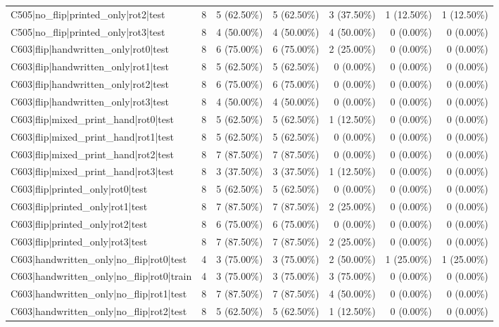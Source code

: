 \begin{longtable}{>{\raggedright\arraybackslash}p{5cm}rrrrrr}
C505|no\_flip|printed\_only|rot2|test & 8 & 5 (62.50\%) & 5 (62.50\%) & 3 (37.50\%) & 1 (12.50\%) & 1 (12.50\%) \\
C505|no\_flip|printed\_only|rot3|test & 8 & 4 (50.00\%) & 4 (50.00\%) & 4 (50.00\%) & 0 (0.00\%) & 0 (0.00\%) \\
C603|flip|handwritten\_only|rot0|test & 8 & 6 (75.00\%) & 6 (75.00\%) & 2 (25.00\%) & 0 (0.00\%) & 0 (0.00\%) \\
C603|flip|handwritten\_only|rot1|test & 8 & 5 (62.50\%) & 5 (62.50\%) & 0 (0.00\%) & 0 (0.00\%) & 0 (0.00\%) \\
C603|flip|handwritten\_only|rot2|test & 8 & 6 (75.00\%) & 6 (75.00\%) & 0 (0.00\%) & 0 (0.00\%) & 0 (0.00\%) \\
C603|flip|handwritten\_only|rot3|test & 8 & 4 (50.00\%) & 4 (50.00\%) & 0 (0.00\%) & 0 (0.00\%) & 0 (0.00\%) \\
C603|flip|mixed\_print\_hand|rot0|test & 8 & 5 (62.50\%) & 5 (62.50\%) & 1 (12.50\%) & 0 (0.00\%) & 0 (0.00\%) \\
C603|flip|mixed\_print\_hand|rot1|test & 8 & 5 (62.50\%) & 5 (62.50\%) & 0 (0.00\%) & 0 (0.00\%) & 0 (0.00\%) \\
C603|flip|mixed\_print\_hand|rot2|test & 8 & 7 (87.50\%) & 7 (87.50\%) & 0 (0.00\%) & 0 (0.00\%) & 0 (0.00\%) \\
C603|flip|mixed\_print\_hand|rot3|test & 8 & 3 (37.50\%) & 3 (37.50\%) & 1 (12.50\%) & 0 (0.00\%) & 0 (0.00\%) \\
C603|flip|printed\_only|rot0|test & 8 & 5 (62.50\%) & 5 (62.50\%) & 0 (0.00\%) & 0 (0.00\%) & 0 (0.00\%) \\
C603|flip|printed\_only|rot1|test & 8 & 7 (87.50\%) & 7 (87.50\%) & 2 (25.00\%) & 0 (0.00\%) & 0 (0.00\%) \\
C603|flip|printed\_only|rot2|test & 8 & 6 (75.00\%) & 6 (75.00\%) & 0 (0.00\%) & 0 (0.00\%) & 0 (0.00\%) \\
C603|flip|printed\_only|rot3|test & 8 & 7 (87.50\%) & 7 (87.50\%) & 2 (25.00\%) & 0 (0.00\%) & 0 (0.00\%) \\
C603|handwritten\_only|no\_flip|rot0|test & 4 & 3 (75.00\%) & 3 (75.00\%) & 2 (50.00\%) & 1 (25.00\%) & 1 (25.00\%) \\
C603|handwritten\_only|no\_flip|rot0|train & 4 & 3 (75.00\%) & 3 (75.00\%) & 3 (75.00\%) & 0 (0.00\%) & 0 (0.00\%) \\
C603|handwritten\_only|no\_flip|rot1|test & 8 & 7 (87.50\%) & 7 (87.50\%) & 4 (50.00\%) & 0 (0.00\%) & 0 (0.00\%) \\
C603|handwritten\_only|no\_flip|rot2|test & 8 & 5 (62.50\%) & 5 (62.50\%) & 1 (12.50\%) & 0 (0.00\%) & 0 (0.00\%) \\

\end{longtable}
